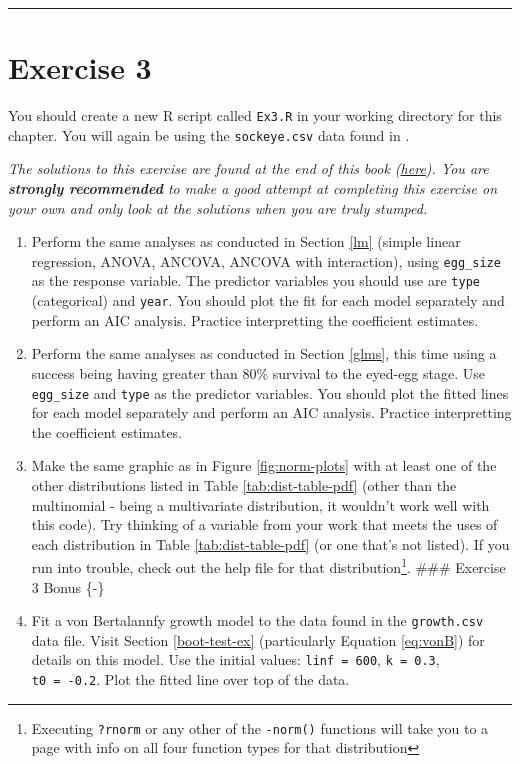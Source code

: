 \documentclass[]{book}
\let\rmarkdownfootnote\footnote%
\def\footnote{\protect\rmarkdownfootnote}
\theoremstyle{definition}
\theoremstyle{definition}
\theoremstyle{definition}
\theoremstyle{remark}
\begin{document}
\begin{center}\rule{0.5\linewidth}{\linethickness}\end{center}

\section*{Exercise 3}\label{exercise-3}

You should create a new R script called \texttt{Ex3.R} in your working
directory for this chapter. You will again be using the
\texttt{sockeye.csv} data found in \citet{sockeye-cite}.

\emph{The solutions to this exercise are found at the end of this book
(\protect\hyperlink{ex3-answers}{here}). You are \textbf{strongly
recommended} to make a good attempt at completing this exercise on your
own and only look at the solutions when you are truly stumped.}

\begin{enumerate}
\def\labelenumi{\arabic{enumi}.}
\item
  Perform the same analyses as conducted in Section \ref{lm} (simple
  linear regression, ANOVA, ANCOVA, ANCOVA with interaction), using
  \texttt{egg\_size} as the response variable. The predictor variables
  you should use are \texttt{type} (categorical) and \texttt{year}. You
  should plot the fit for each model separately and perform an AIC
  analysis. Practice interpretting the coefficient estimates.
\item
  Perform the same analyses as conducted in Section \ref{glms}, this
  time using a success being having greater than 80\% survival to the
  eyed-egg stage. Use \texttt{egg\_size} and \texttt{type} as the
  predictor variables. You should plot the fitted lines for each model
  separately and perform an AIC analysis. Practice interpretting the
  coefficient estimates.
\item
  Make the same graphic as in Figure \ref{fig:norm-plots} with at least
  one of the other distributions listed in Table
  \ref{tab:dist-table-pdf} (other than the multinomial - being a
  multivariate distribution, it wouldn't work well with this code). Try
  thinking of a variable from your work that meets the uses of each
  distribution in Table \ref{tab:dist-table-pdf} (or one that's not
  listed). If you run into trouble, check out the help file for that
  distribution\footnote{Executing \texttt{?rnorm} or any other of the
    \texttt{-norm()} functions will take you to a page with info on all
    four function types for that distribution}. \#\#\# Exercise 3 Bonus
  \{-\}
\item
  Fit a von Bertalannfy growth model to the data found in the
  \texttt{growth.csv} data file. Visit Section \ref{boot-test-ex}
  (particularly Equation \eqref{eq:vonB}) for details on this model. Use
  the initial values: \texttt{linf\ =\ 600}, \texttt{k\ =\ 0.3},
  \texttt{t0\ =\ -0.2}. Plot the fitted line over top of the data.
\end{enumerate}
\end{document}
